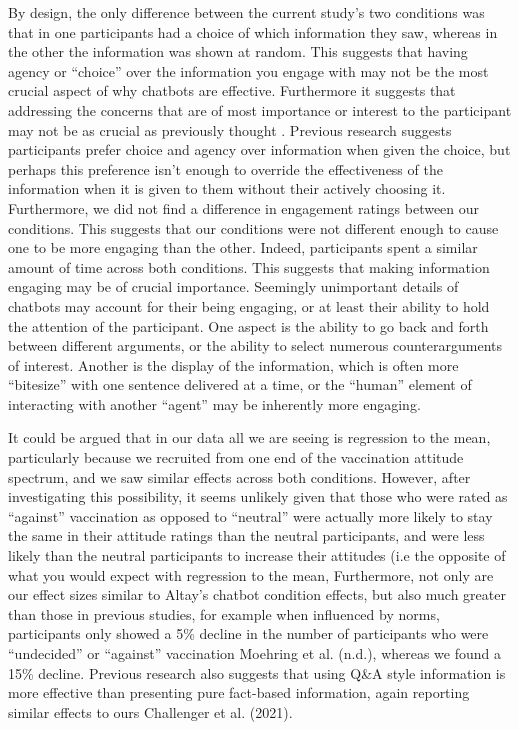 \documentclass[english,,jou,floatsintext]{apa6}
\begin{document}
By design, the only difference between the current study's two conditions was that in one participants had a choice of which information they saw, whereas in the other the information was shown at random. This suggests that having agency or \enquote{choice} over the information you engage with may not be the most crucial aspect of why chatbots are effective. Furthermore it suggests that addressing the concerns that are of most importance or interest to the participant may not be as crucial as previously thought . Previous research suggests participants prefer choice and agency over information when given the choice, but perhaps this preference isn't enough to override the effectiveness of the information when it is given to them without their actively choosing it. Furthermore, we did not find a difference in engagement ratings between our conditions. This suggests that our conditions were not different enough to cause one to be more engaging than the other. Indeed, participants spent a similar amount of time across both conditions. This suggests that making information engaging may be of crucial importance. Seemingly unimportant details of chatbots may account for their being engaging, or at least their ability to hold the attention of the participant. One aspect is the ability to go back and forth between different arguments, or the ability to select numerous counterarguments of interest. Another is the display of the information, which is often more \enquote{bitesize} with one sentence delivered at a time, or the \enquote{human} element of interacting with another \enquote{agent} may be inherently more engaging.

It could be argued that in our data all we are seeing is regression to the mean, particularly because we recruited from one end of the vaccination attitude spectrum, and we saw similar effects across both conditions. However, after investigating this possibility, it seems unlikely given that those who were rated as \enquote{against} vaccination as opposed to \enquote{neutral} were actually more likely to stay the same in their attitude ratings than the neutral participants, and were less likely than the neutral participants to increase their attitudes (i.e the opposite of what you would expect with regression to the mean, Furthermore, not only are our effect sizes similar to Altay's chatbot condition effects, but also much greater than those in previous studies, for example when influenced by norms, participants only showed a 5\% decline in the number of participants who were \enquote{undecided} or \enquote{against} vaccination Moehring et al. (n.d.), whereas we found a 15\% decline. Previous research also suggests that using Q\&A style information is more effective than presenting pure fact-based information, again reporting similar effects to ours Challenger et al. (2021).
\end{document}
